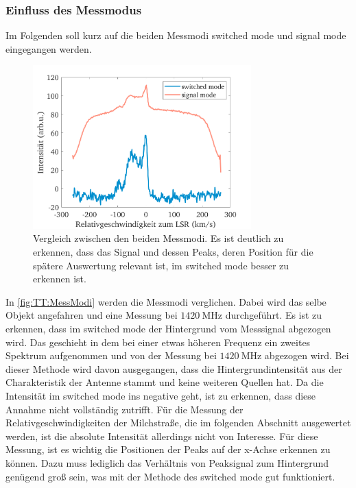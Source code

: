 \documentclass[../../main.tex]{subfiles}
\begin{document}
    \subsubsection{Einfluss des Messmodus}
        Im Folgenden soll kurz auf die beiden Messmodi \glqq{}switched mode\grqq{} und \glqq{}signal mode\grqq{} eingegangen werden.
        \begin{figure}[H]
            \centering
            \includegraphics[width=0.75\textwidth]{Bilddateien/Modi/Fig_10.png}
            \caption{Vergleich zwischen den beiden Messmodi. Es ist deutlich zu erkennen, dass das Signal und dessen Peaks, deren Position für die spätere Auswertung relevant ist, im \glqq{}switched mode\grqq{} besser zu erkennen ist.}
            \label{fig:TT:MessModi}
        \end{figure}
        In \autoref{fig:TT:MessModi} werden die Messmodi verglichen. Dabei wird das selbe Objekt angefahren und eine Messung bei $\SI{1420}{\mega \hertz}$ durchgeführt. Es ist zu erkennen, dass im \glqq{}switched mode\grqq{} der Hintergrund vom Messsignal abgezogen wird. Das geschieht in dem bei einer etwas höheren Frequenz ein zweites Spektrum aufgenommen und von der Messung bei $\SI{1420}{\mega \hertz}$ abgezogen wird. Bei dieser Methode wird davon ausgegangen, dass die Hintergrundintensität aus der Charakteristik der Antenne stammt und keine weiteren Quellen hat. Da die Intensität im \glqq{}switched mode\grqq{} ins negative geht, ist zu erkennen, dass diese Annahme nicht vollständig zutrifft. Für die Messung der Relativgeschwindigkeiten der Milchstraße, die im folgenden Abschnitt ausgewertet werden, ist die absolute Intensität allerdings nicht von Interesse. Für diese Messung, ist es wichtig die Positionen der Peaks auf der x-Achse erkennen zu können. Dazu muss lediglich das Verhältnis von Peaksignal zum Hintergrund genügend groß sein, was mit der Methode des \glqq{}switched mode\grqq{} gut funktioniert.
\end{document}
